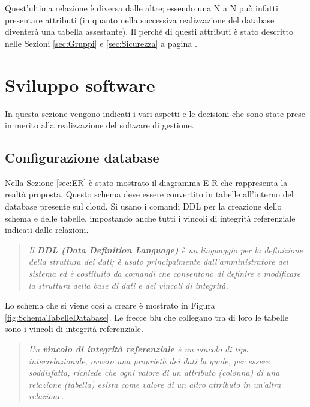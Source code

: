 \documentclass{article}
\begin{document}
Quest'ultima relazione è diversa dalle altre; essendo una N a N può infatti presentare attributi (in quanto nella successiva realizzazione del database diventerà una tabella assestante). Il perché di questi attributi è stato descritto nelle Sezioni \ref{sec:Gruppi} e \ref{sec:Sicurezza} a pagina \pageref{sec:Gruppi}.


\section{Sviluppo software}\label{sec:SviluppoSoftware}
In questa sezione vengono indicati i vari aspetti e le decisioni che sono state prese in merito alla realizzazione del software di gestione.

\subsection{Configurazione database}\label{sec:ConfigurazioneDatabase}
Nella Sezione \ref{sec:ER} è stato mostrato il diagramma E-R che rappresenta la realtà proposta. Questo schema deve essere convertito in tabelle all'interno del database presente sul cloud. 
Si usano i comandi DDL per la creazione dello schema e delle tabelle, impostando anche tutti i vincoli di integrità referenziale indicati dalle relazioni.

\begin{quote}
    \begin{Cit}
    \textit{
    Il \textbf{DDL (Data Definition Language)} è un linguaggio per la definizione della struttura dei dati; è usato principalmente dall'amministratore del sistema ed è costituito da comandi che consentono di definire e modificare la struttura della base di dati e dei vincoli di integrità.}
    \end{Cit}
    \end{quote}
    
Lo schema che si viene così a creare è mostrato in Figura \ref{fig:SchemaTabelleDatabase}. Le frecce blu che collegano tra di loro le tabelle sono i vincoli di integrità referenziale.

\begin{quote}
    \begin{Cit}
    \textit{
    Un \textbf{vincolo di integrità referenziale} è un vincolo di tipo interrelazionale, ovvero una proprietà dei dati la quale, per essere soddisfatta, richiede che ogni valore di un attributo (colonna) di una relazione (tabella) esista come valore di un altro attributo in un'altra relazione.}
    \end{Cit}
    \end{quote}
    
\end{document}
